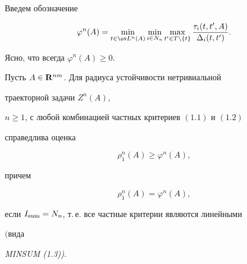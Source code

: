  


Введем обозначение 


$$ 


\varphi^n(A)=\min_{t\in\ov L^n(A)}\min_{i\in N_n} 


\max_{t'\in T\setminus\{t\}} 


\frac{\tau_i(t,t',A)}{\Delta_i(t,t')}. 


$$ 


Ясно, что всегда $\varphi^n(A)\ge 0$. 


 


\begin{thms} 


Пусть $A\in\bold R^{nm}$. Для радиуса устойчивости нетривиальной 


траекторной задачи $Z^n(A)$, 


$n\ge 1$, с любой комбинацией частных критериев $(1.1)$ и $(1.2)$ 


справедлива оценка 


\begin{equation} 


\rho^n_1(A)\ge\varphi^n(A), 


\end{equation} 


причем 


\begin{equation} 


\rho^n_1(A)=\varphi^n(A), 


\end{equation} 


если $I_{\operatorname{sum}}=N_n$, т.\,е.{} все частные критерии являются линейными 


$($вида 


{\em MINSUM (1.3))}. 


\end{thms} 


 


